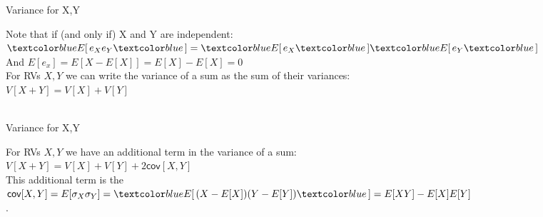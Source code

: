 \documentclass[10pt,sans,english,compress,xcolor=dvipsnames]{beamer}
\begin{document}
\begin{frame}{Variance for  X,Y}
\footnotesize

Note that if (and only if) X and Y are independent: \\[1ex]

$\bbl{E[\,}  e_X  e_Y  \bbl{\,]}= \bbl{E[\,}  e_X\bbl{\,]} \bbl{E[\,}   e_Y  \bbl{\,]}$\\[1ex]

And  $E[e_x]=  E[X-E[X] ] = E[X]-E[X] = 0$\\[1ex]

For  RVs $X, Y $ we can write the variance of a sum as the sum of their variances:\\[1ex]

$V[X+Y] =  V[X] + V[Y]$\\[1ex]

\\

\end{frame} 


\begin{frame}{Variance for  X,Y}
\footnotesize

For  RVs $X, Y $ we have an additional term in the variance of a sum:\\[1ex]

$V[X+Y] =  V[X] + V[Y] + 2\mathsf{cov}[X,Y]$\\[1ex]

This additional term is the \\[1ex]

$\mathsf{cov}[X,Y] = E[ \sigma_X  \sigma_Y ]  = \bbl{E[\,}  (X-E[X])(Y-E[Y] ) \bbl{\,]} = E[XY] - E[X]E[Y]$\\[1ex]

.

\end{frame} 
\end{document}
